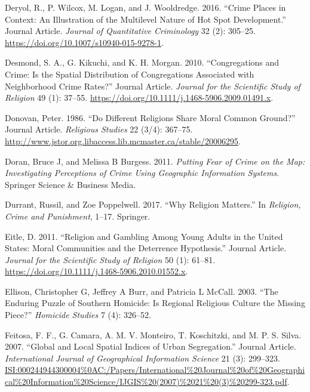 \documentclass[smallextended]{svjour3}       %
\begin{document}
\leavevmode\hypertarget{ref-Deryol2016crime}{}%
Deryol, R., P. Wilcox, M. Logan, and J. Wooldredge. 2016. ``Crime Places
in Context: An Illustration of the Multilevel Nature of Hot Spot
Development.'' Journal Article. \emph{Journal of Quantitative
Criminology} 32 (2): 305--25.
\url{https://doi.org/10.1007/s10940-015-9278-1}.

\leavevmode\hypertarget{ref-Desmond2010congregations}{}%
Desmond, S. A., G. Kikuchi, and K. H. Morgan. 2010. ``Congregations and
Crime: Is the Spatial Distribution of Congregations Associated with
Neighborhood Crime Rates?'' Journal Article. \emph{Journal for the
Scientific Study of Religion} 49 (1): 37--55.
\url{https://doi.org/10.1111/j.1468-5906.2009.01491.x}.

\leavevmode\hypertarget{ref-Donovan1986different}{}%
Donovan, Peter. 1986. ``Do Different Religions Share Moral Common
Ground?'' Journal Article. \emph{Religious Studies} 22 (3/4): 367--75.
\url{http://www.jstor.org.libaccess.lib.mcmaster.ca/stable/20006295}.

\leavevmode\hypertarget{ref-Doran2011putting}{}%
Doran, Bruce J, and Melissa B Burgess. 2011. \emph{Putting Fear of Crime
on the Map: Investigating Perceptions of Crime Using Geographic
Information Systems}. Springer Science \& Business Media.

\leavevmode\hypertarget{ref-Durrant2017religion}{}%
Durrant, Russil, and Zoe Poppelwell. 2017. ``Why Religion Matters.'' In
\emph{Religion, Crime and Punishment}, 1--17. Springer.

\leavevmode\hypertarget{ref-Eitle2011religion}{}%
Eitle, D. 2011. ``Religion and Gambling Among Young Adults in the United
States: Moral Communities and the Deterrence Hypothesis.'' Journal
Article. \emph{Journal for the Scientific Study of Religion} 50 (1):
61--81. \url{https://doi.org/10.1111/j.1468-5906.2010.01552.x}.

\leavevmode\hypertarget{ref-Ellison2003enduring}{}%
Ellison, Christopher G, Jeffrey A Burr, and Patricia L McCall. 2003.
``The Enduring Puzzle of Southern Homicide: Is Regional Religious
Culture the Missing Piece?'' \emph{Homicide Studies} 7 (4): 326--52.

\leavevmode\hypertarget{ref-Feitosa2007global}{}%
Feitosa, F. F., G. Camara, A. M. V. Monteiro, T. Koschitzki, and M. P.
S. Silva. 2007. ``Global and Local Spatial Indices of Urban
Segregation.'' Journal Article. \emph{International Journal of
Geographical Information Science} 21 (3): 299--323.
\url{ISI:000244944300004\%0AC:/Papers/International\%20Journal\%20of\%20Geographical\%20Information\%20Science/IJGIS\%20(2007)\%2021\%20(3)\%20299-323.pdf}.
\end{document}
